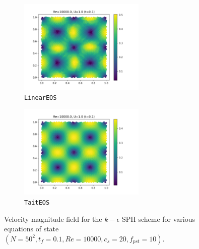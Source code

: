 \begin{figure}[htbp!]
  \begin{subfigure}{7cm}
    \centering\includegraphics[width=6cm]{Code-Figures/keps/eos/c0_20_linear_pec_dtmul_1_nx_50_pst_10_re_10000_k_eps/final_vmag.png}
    \caption{\texttt{LinearEOS}}
  \end{subfigure}
  \begin{subfigure}{7cm}
    \centering\includegraphics[width=6cm]{Code-Figures/keps/eos/c0_20_tait_pec_dtmul_1_nx_50_pst_10_re_10000_k_eps/final_vmag.png}
    \caption{\texttt{TaitEOS}}
  \end{subfigure}
  \caption{Velocity magnitude field for the $k-\epsilon$ SPH scheme for various equations of state $(N=50^2, t_f=0.1, Re=10000, c_s=20, f_{pst}=10)$.}
  \label{fig:keps-eos-vmag}
\end{figure}

